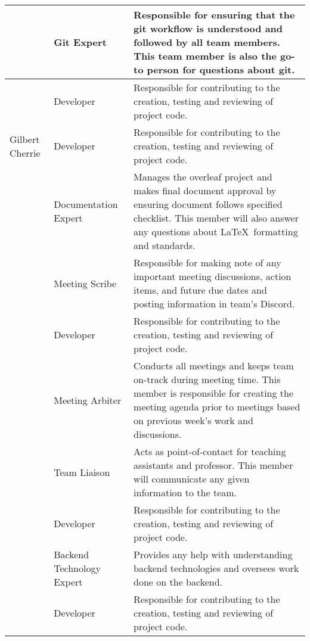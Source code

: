 \documentclass{article}
\begin{document}
\begin{longtable}{|>{\centering\arraybackslash}m{.22\linewidth}|>{\centering\arraybackslash}m{.19\linewidth}|m{.59\linewidth}| }
\multirow{2}{*}{\centering Tevis Doe} & Git Expert & Responsible for ensuring that the git workflow is understood and followed by all team members. This team member is also the go-to person for questions about git.  \\
\cline{2-3}
& Developer & Responsible for contributing to the creation, testing and reviewing of project code.\\
\hline
Gilbert Cherrie & Developer & Responsible for contributing to the creation, testing and reviewing of project code. \\ 
\hline
\multirow{3}{*}{Rachel Johnson} & Documentation Expert &  Manages the overleaf project and makes final document approval by ensuring document follows specified checklist. This member will also answer any questions about \LaTeX\ formatting and standards. \\ 
\cline{2-3}
& \label{role:meetingscrib} Meeting Scribe & Responsible for making note of any important meeting discussions, action items, and future due dates and posting information in team's Discord. \\ 
\cline{2-3}
& Developer & Responsible for contributing to the creation, testing and reviewing of project code.\\
\hline
\label{role:meetingarb} \multirow{3}{4.5em}{\centering Harkeerat Kanwal} & Meeting Arbiter & Conducts all meetings and keeps team on-track during meeting time. This member is responsible for creating the meeting agenda prior to meetings based on previous week's work and discussions. \\ 
\cline{2-3}
& Team Liaison & Acts as point-of-contact for teaching assistants and professor. This member will communicate any given information to the team. \\ 
\cline{2-3}
& Developer & Responsible for contributing to the creation, testing and reviewing of project code.\\
\hline
\multirow{2}{4em}{\centering Himanshu Aggarwal} & Backend Technology Expert & Provides any help with understanding backend technologies and oversees work done on the backend. \\ 
\cline{2-3}
& Developer & Responsible for contributing to the creation, testing and reviewing of project code.\\
\hline
\end{longtable}

\end{document}
